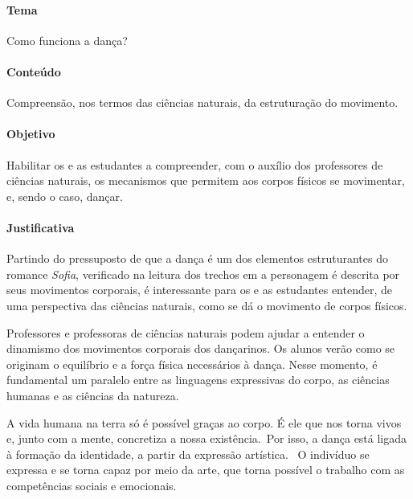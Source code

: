 \documentclass[12pt]{extarticle}
\begin{document}
\paragraph{Tema} Como funciona a dança?

\paragraph{Conteúdo} Compreensão, nos termos das ciências naturais, da estruturação do movimento.

\paragraph{Objetivo} Habilitar os e as estudantes a compreender, com o auxílio dos professores
de ciências naturais, os mecanismos que permitem aos corpos físicos se movimentar, e, sendo o caso,
dançar.

\paragraph{Justificativa} Partindo do pressuposto de que a dança é um dos elementos estruturantes
do romance \textit{Sofia}, verificado na leitura dos trechos em a personagem é descrita por seus
movimentos corporais, é interessante para os e as estudantes entender, de uma perspectiva
das ciências naturais, como se dá o movimento de corpos físicos. 

Professores e professoras de ciências naturais podem ajudar a
entender o dinamismo dos movimentos corporais dos dançarinos. Os alunos verão
como se originam o equilíbrio e a força física necessários à dança. Nesse momento, é fundamental
um paralelo entre as linguagens expressivas do corpo, as ciências humanas e as
ciências da natureza. 

A vida humana na terra só é possível graças ao corpo. É
ele que nos torna vivos e, junto com a mente, concretiza a nossa existência. Por isso, a dança está ligada à formação da identidade, a partir da expressão
artística.  O indivíduo se expressa e se torna capaz por meio da arte, que
torna possível o trabalho com as competências sociais e emocionais.
\end{document}
